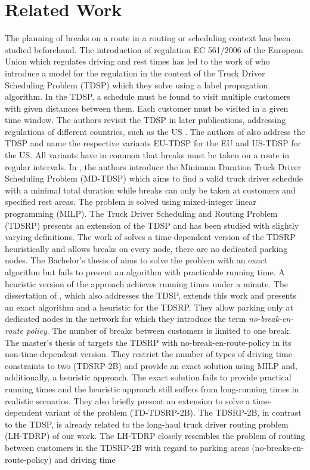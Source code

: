 
\chapter{Related Work\label{ch:related_work}}
The planning of breaks on a route in a routing or scheduling context has been studied beforehand. The introduction of regulation EC 561/2006 of the European Union \cite{europeanparliament:2006} which regulates driving and rest times has led to the work of \cite{goel:2009a} who introduce a model for the regulation in the context of the Truck Driver Scheduling Problem (TDSP) which they solve using a label propagation algorithm. In the TDSP, a schedule must be found to visit multiple customers with given distances between them. Each customer must be visited in a given time window. The authors revisit the TDSP in later publications, addressing regulations of different countries, such as the US \cite{goel:2012c}. The authors of \cite{sartori:2022} also address the TDSP and name the respective variants EU-TDSP for the EU and US-TDSP for the US. All variants have in common that breaks must be taken on a route in regular intervals. In \cite{goel:2012b}, the authors introduce the Minimum Duration Truck Driver Scheduling Problem (MD-TDSP) which aims to find a valid truck driver schedule with a minimal total duration while breaks can only be taken at customers and specified rest areas. The problem is solved using mixed-integer linear programming (MILP). The Truck Driver Scheduling and Routing Problem (TDSRP) presents an extension of the TDSP and has been studied with slightly varying definitions. The work of \cite{shah:2008} solves a time-dependent version of the TDSRP heuristically and allows breaks on every node, there are no dedicated parking nodes. The Bachelor's thesis of \cite{braeuer:2016} aims to solve the problem with an exact algorithm but fails to present an algorithm with practicable running time. A heuristic version of the approach achieves running times under a minute. The dissertation of \cite{kleff:2019}, which also addresses the TDSP, extends this work and presents an exact algorithm and a heuristic for the TDSRP. They allow parking only at dedicated nodes in the network for which they introduce the term \emph{no-break-en-route policy}. The number of breaks between customers is limited to one break. The master's thesis of \cite{bomsdorf:2020} targets the TDSRP with no-break-en-route-policy in its non-time-dependent version. They restrict the number of types of driving time constraints to two (TDSRP-2B) and provide an exact solution using MILP and, additionally, a heuristic approach. The exact solution fails to provide practical running times and the heuristic approach still suffers from long-running times in realistic scenarios. They also briefly present an extension to solve a time-dependent variant of the problem (TD-TDSRP-2B). The TDSRP-2B, in contrast to the TDSP, is already related to the long-haul truck driver routing problem (LH-TDRP) of our work. The LH-TDRP closely resembles the problem of routing between customers in the TDSRP-2B with regard to parking areas (no-breaks-en-route-policy) and driving time 